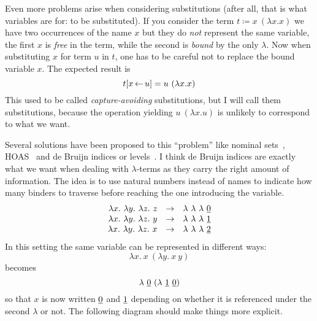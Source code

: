 Even more problems arise when considering substitutions (after all, that is what
variables are for: to be substituted).
If you consider the term \(t \coloneqq x\ (\lambda x. x)\) we have two
occurrences of the name \(x\) but they do \emph{not} represent the same
variable, the first \(x\) is \emph{free} in the term, while the second is
\emph{bound} by the only \(\lambda\).
Now when substituting \(x\) for term \(u\) in \(t\), one has to be careful not
to replace the bound variable \(x\). The expected result is
\[
  t[x \sto u] = u\ (\lambda x. x)
\]
This used to be called \emph{capture-avoiding} substitutions, but I will call
them substitutions, because the operation yielding \(u\ (\lambda x. u)\)
is unlikely to correspond to what we want.

Several solutions have been proposed to this ``problem'' like nominal
sets~,
\acrfull{HOAS}~ and de Bruijn indices or
levels~.
I think de Bruijn indices are exactly what we want when dealing with
\(\lambda\)-terms as they carry the right amount of information.
The idea is to use natural numbers instead of names to indicate how many binders
to traverse before reaching the one introducing the variable.
\[
  \begin{array}{rcl}
    \lambda x.\ \lambda y.\ \lambda z.\ z
    &\to& \lambda\ \lambda\ \lambda\ \underline{0} \\
    \lambda x.\ \lambda y.\ \lambda z.\ y
    &\to& \lambda\ \lambda\ \lambda\ \underline{1} \\
    \lambda x.\ \lambda y.\ \lambda z.\ x
    &\to& \lambda\ \lambda\ \lambda\ \underline{2}
  \end{array}
\]
In this setting the same variable can be represented in different ways:
\[
  \lambda x.\ x\ (\lambda y.\ x\ y)
\]
becomes
\[
  \lambda\ \db{0}\ (\lambda\ \db{1}\ \db{0})
\]
so that \(x\) is now written \(\underline{0}\) and \(\underline{1}\) depending on whether it
is referenced under the second \(\lambda\) or not.
The following diagram should make things more explicit.

\begin{center}
\end{center}

